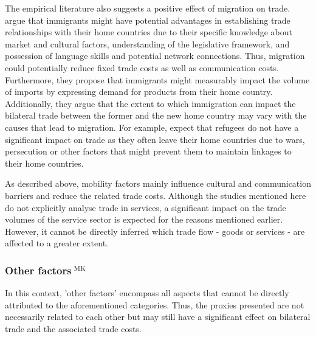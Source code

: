 The empirical literature also suggests a positive effect of migration on trade. \textcite{Head1998} argue that immigrants might have potential advantages in establishing trade relationships with their home countries due to their specific knowledge about market and cultural factors, understanding of the legislative framework, and possession of language skills and potential network connections. Thus, migration could potentially reduce fixed trade costs as well as communication costs. Furthermore, they propose that immigrants might measurably impact the volume of imports by expressing demand for products from their home country. Additionally, they argue that the extent to which immigration can impact the bilateral trade between the former and the new home country may vary with the causes that lead to migration. For example, \textcite{Head1998} expect that refugees do not have a significant impact on trade as they often leave their home countries due to wars, persecution or other factors that might prevent them to maintain linkages to their home countries. %

As described above, mobility factors mainly influence cultural and communication barriers and reduce the related trade costs. Although the studies mentioned here do not explicitly analyse trade in services, a significant impact on the trade volumes of the service sector is expected for the reasons mentioned earlier. However, it cannot be directly inferred which trade flow - goods or services - are affected to a greater extent. 

\subsubsection[Other factors]{Other factors$^{\text{ MK}}$}
\label{sec:other}

In this context, 'other factors' encompass all aspects that cannot be directly attributed to the aforementioned categories. Thus, the proxies presented are not necessarily related to each other but may still have a significant effect on bilateral trade and the associated trade costs. 

